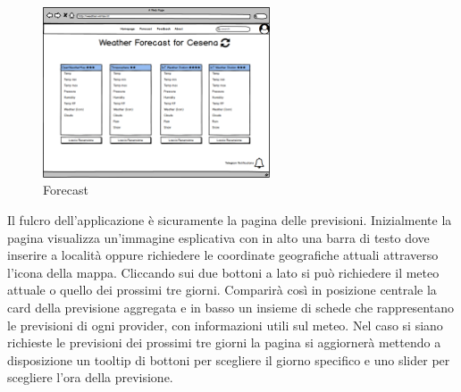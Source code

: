 \begin{figure}[H]
    \caption{Forecast}
    \label{fig:Forecast}
    \centering
    \includegraphics[width=0.6\textwidth]{MockUps/forecast.png}
\end{figure}
Il fulcro dell'applicazione è sicuramente la pagina delle previsioni. Inizialmente la pagina visualizza un'immagine esplicativa con in alto una barra di testo dove inserire a località oppure richiedere le coordinate geografiche attuali attraverso l'icona della mappa. Cliccando sui due bottoni a lato si può richiedere il meteo attuale o quello dei prossimi tre giorni. Comparirà così  in posizione centrale la card della previsione aggregata e in basso un insieme di schede che rappresentano le previsioni di ogni provider, con informazioni utili sul meteo.
 Nel caso si siano richieste le previsioni dei prossimi tre giorni la pagina si aggiornerà mettendo a disposizione un tooltip di bottoni per scegliere il giorno specifico e uno slider per scegliere l'ora della previsione.

